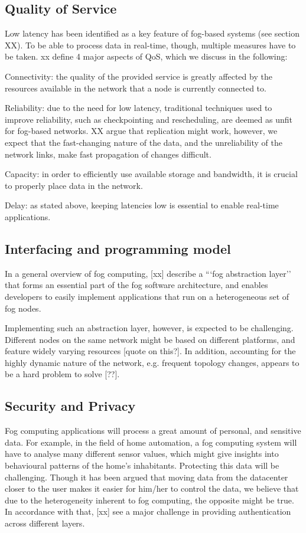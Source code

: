 \documentclass{article}
\begin{document}
\subsection{Quality of Service}
Low latency has been identified as a key feature of fog-based systems (see section XX). To be able to process data in real-time, though, multiple measures have to be taken.
xx define 4 major aspects of QoS, which we discuss in the following:

Connectivity: the quality of the provided service is greatly affected by the resources available in the network that a node is currently connected to. 

Reliability: due to the need for low latency, traditional techniques used to improve reliability, such as checkpointing and rescheduling, are deemed as unfit for fog-based networks. XX argue that replication might work, however, we expect that the fast-changing nature of the data, and the unreliability of the network links, make fast propagation of changes difficult.

Capacity: in order to efficiently use available storage and bandwidth, it is crucial to properly place data in the network.

Delay: as stated above, keeping latencies low is essential to enable real-time applications.

\subsection{Interfacing and programming model}
In a general overview of fog computing, [xx] describe a ```fog abstraction layer'' that forms an essential part of the fog software architecture, and enables developers to easily implement applications that run on a heterogeneous set of fog nodes.

Implementing such an abstraction layer, however, is expected to be challenging. Different nodes on the same network might be based on different platforms, and feature widely varying resources [quote on this?]. In addition, accounting for the highly dynamic nature of the network, e.g. frequent topology changes, appears to be a hard problem to solve [??].

\subsection{Security and Privacy}
Fog computing applications will process a great amount of personal, and sensitive data. For example, in the field of home automation, a fog computing system will have to analyse many different sensor values, which might give insights into behavioural patterns of the home's inhabitants. Protecting this data will be challenging. Though it has been argued that moving data from the datacenter closer to the user makes it easier for him/her to control the data, we believe that due to the heterogeneity inherent to fog computing, the opposite might be true. In accordance with that, [xx] see a major challenge in providing authentication across different layers.
\end{document}
